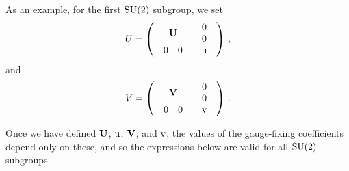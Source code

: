 \documentclass[
 reprint,
 amsmath,amssymb,
 aps,
prd,
]{revtex4-1}
\begin{document}
As an example, for the first $\mathrm{SU}(2)$ subgroup, we set
\begin{equation}
U = \left( \begin{array}{cc}
{\bf U} & \begin{array}{cc} 0 \\ 0 \end{array} \\
\begin{array}{cc} 0 & 0 \end{array} & \mathrm{u} \\
\end{array} \right)\,,
\end{equation}
and
\begin{equation}
V = \left( \begin{array}{cc}
{\bf V} & \begin{array}{cc} 0 \\ 0 \end{array} \\
\begin{array}{cc} 0 & 0 \end{array} & \mathrm{v} \\
\end{array} \right)\,.
\end{equation}

Once we have defined ${\bf U}$, $\mathrm{u}$, ${\bf V}$, and $\mathrm{v}$, the values of the gauge-fixing coefficients depend only on these, and so the expressions below are valid for all $\mathrm{SU}(2)$ subgroups.
\end{document}
